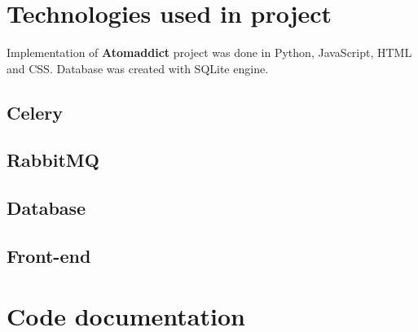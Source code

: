 \documentclass[12pt]{article}
\begin{document}
\vspace{0.5cm}

\section{Technologies used in project}
Implementation of \textbf{Atomaddict} project was done in Python, JavaScript, HTML and CSS. Database was created with SQLite engine.

\subsection{Celery}

\subsection{RabbitMQ}

\subsection{Database}

\subsection{Front-end}

\section{Code documentation}



\end{document}
